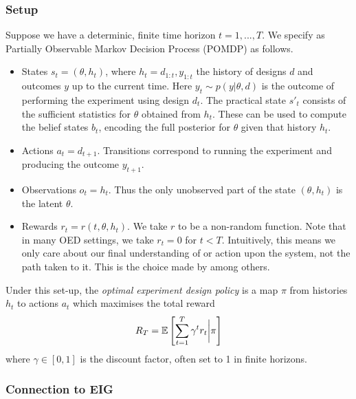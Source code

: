 \subsubsection{Setup}
Suppose we have a determinic, finite time horizon $t=1, ..., T$. We specify as Partially Observable Markov Decision Process (POMDP) as follows.
\begin{itemize}
\item States $s_t = (\theta, h_t)$, where $h_t = d_{1:t}, y_{1:t}$ the history of designs $d$ and outcomes $y$ up to the current time. Here $y_t \sim p(y | \theta, d)$ is the outcome of performing the experiment using design $d_t$. The practical state $s'_t$ consists of the sufficient statistics for $\theta$ obtained from $h_t$. These can be used to compute the belief states $b_t$, encoding the full posterior for $\theta$ given that history $h_t$.
\item Actions $a_t = d_{t+1}$. Transitions correspond to running the experiment and producing the outcome $y_{t+1}$.
\item Observations $o_t = h_t$. Thus the only unobserved part of the state $(\theta, h_t)$ is the latent $\theta$.
\item Rewards $r_t = r(t, \theta, h_t)$. We take $r$ to be a non-random function. Note that in many OED settings, we take $r_t = 0$ for $t<T$. Intuitively, this means we only care about our final understanding of or action upon the system, not the path taken to it. This is the choice made by \cite{gonzalez2016} among others.
\end{itemize}
Under this set-up, the \textit{optimal experiment design policy} is a map $\pi$ from histories $h_t$ to actions $a_t$ which maximises the total reward
\begin{equation}
	R_T = \mathbb{E} \left[ \sum_{t=1}^T \gamma^t r_t \bigg{\rvert} \pi \right]
\end{equation}
where $\gamma \in [0,1]$ is the discount factor, often set to 1 in finite horizons.


\subsubsection{Connection to EIG}
